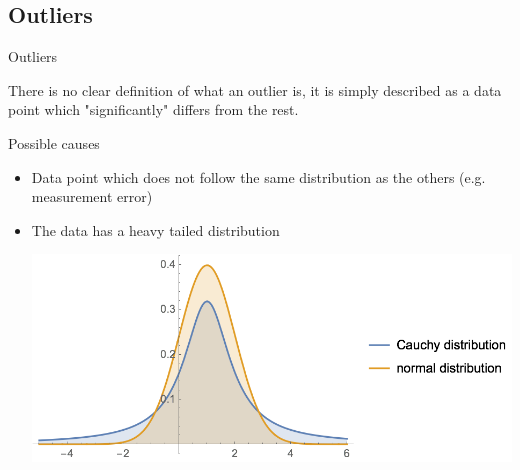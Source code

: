 \documentclass{beamer}
\begin{document}
\subsection{Outliers}
\begin{frame}{Outliers}

There is no clear definition of what an outlier is, it is simply described as a data point which "significantly" differs from the rest.

\begin{block}{Possible causes}
\begin{itemize}
\item Data point which does not follow the same distribution as the others (e.g. measurement error)
\item The data has a heavy tailed distribution\\
\begin{center}
\includegraphics[scale=0.3]{NormalCaucy.png}
\end{center}
\end{itemize}
\end{block}

\end{frame}
\end{document}
